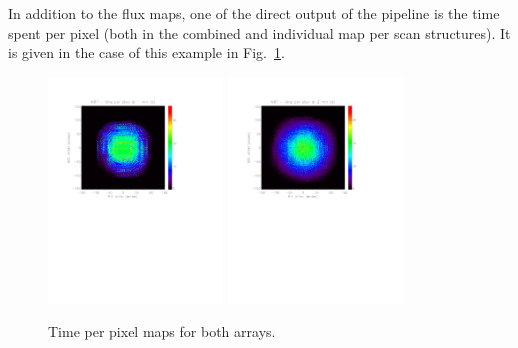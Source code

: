 \documentclass[a4paper]{article}
\begin{document}
In addition to the flux maps, one of the direct output of the pipeline is the time spent per pixel (both in the combined and individual map per scan structures). It is given in the case of this example in Fig.~\ref{fig:M87_time}.
\begin{figure}
\centering
\includegraphics[height=6cm, trim=2cm 13cm 4cm 2cm, clip=true]{Figure/M87_time_map_1mm}
\includegraphics[height=6cm, trim=2cm 13cm 4cm 2cm, clip=true]{Figure/M87_time_map_2mm}
\caption{Time per pixel maps for both arrays.}
\label{fig:M87_time}
\end{figure}
\end{document}
